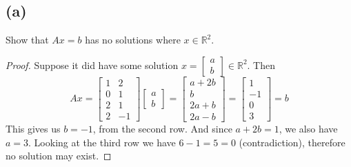 \documentclass{article}
\begin{document}
\subsection*{(a)}
Show that $Ax = b$ has no solutions where $x \in \mathbb{R}^2$.
\begin{proof}
Suppose it did have some solution $x = \begin{bmatrix}a\\b\end{bmatrix} \in \mathbb{R}^2$. Then 
\[ Ax = \begin{bmatrix}1&2\\0&1\\2&1\\2&-1\end{bmatrix} \begin{bmatrix}a\\b\end{bmatrix} = \begin{bmatrix}a+2b\\b\\2a+b\\2a-b\end{bmatrix} =  \begin{bmatrix}1\\-1\\0\\3\end{bmatrix} = b\]
This gives us $b= -1$, from the second row. And since $a+2b = 1$, we also have $a = 3$. Looking at the third row we have $6-1 = 5 = 0$ (contradiction), therefore no solution may exist.
\end{proof}
\end{document}
